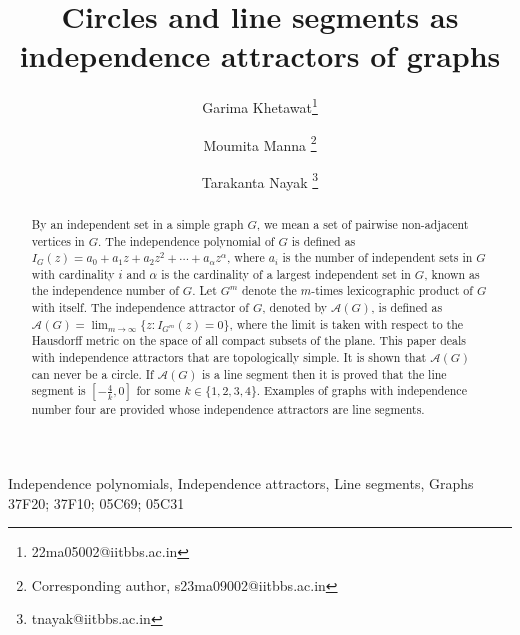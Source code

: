 \documentclass[12pt,a4paper]{article}
\theoremstyle{plain}
\numberwithin{equation}{section}
\begin{document}
\title{  Circles and line segments as independence attractors of graphs}
\author[1]{Garima Khetawat\footnote{22ma05002@iitbbs.ac.in}}
\author[2]{Moumita Manna \footnote{Corresponding author, s23ma09002@iitbbs.ac.in}}
\author[3]{Tarakanta Nayak	\footnote{tnayak@iitbbs.ac.in}}
\date{}
\maketitle
 \linespread{1}
\begin{abstract}
 By an independent set in a simple graph $G$, we mean a set of pairwise non-adjacent vertices in $G$. The independence polynomial of $G$ is defined as $I_G(z)=a_0 + a_1 z + a_2 z^2+\cdots+a_\alpha z^{\alpha}$, where $a_i$ is the number of independent sets in $G$ with cardinality $i$ and $\alpha$ is the cardinality of a largest independent set in $G$,  known as the independence number of $G$.  Let $G^m$ denote the $m$-times lexicographic product of $G$ with itself. The independence attractor  of $G$, denoted by   $\mathcal{A}(G)$, is defined as  $\mathcal{A}(G) =  \lim_{m\rightarrow \infty} \{z: I_{G^m}(z)=0\}$, where the limit is taken with respect to the Hausdorff metric on the space of all compact subsets of the plane. This paper deals with independence attractors that are topologically simple. It is shown that $\mathcal{A}(G)$ can never be a circle.  
If  $\mathcal{A}(G)$ is a line segment  then it is proved that the line segment is $[-\frac{4}{k}, 0]$ for some $k \in \{1, 2, 3, 4 \}$. Examples of graphs with independence number four are provided whose independence attractors are line segments.
 

\end{abstract}
 Independence polynomials, Independence attractors, Line segments, Graphs
\\
 37F20; 37F10; 05C69; 05C31 

\end{document}
